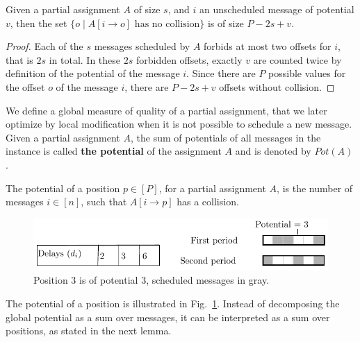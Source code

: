 \documentclass[a4paper,UKenglish,cleveref, autoref, thm-restate]{lipics-v2019}
\begin{document}
\begin{lemma}
Given a partial assignment $A$ of size $s$, and $i$ an unscheduled message of potential 
$v$, then the set $\{o \mid A[i \rightarrow o] \text{ has no collision}\}$ is of size $P - 2s + v$.
\end{lemma}
\begin{proof}
 Each of the $s$ messages scheduled by $A$ forbids at most two offsets for $i$, that is $2s$ in total. In these $2s$ forbidden offsets, exactly $v$ are counted twice by definition of the potential
 of the message $i$. Since there are $P$ possible values for the offset $o$ of the message $i$, there are $P - 2s + v$ offsets without collision.
\end{proof}

We define a global measure of quality of a partial assignment, that we later optimize by local modification when it is not possible to schedule a new message. 
Given a partial assignment $A$, the sum of potentials of all messages in the instance is called \textbf{the potential} of the assignment $A$ and is denoted by $Pot(A)$. 


\begin{definition}
The potential of a position $p \in [P]$, for a partial assignment $A$, is the number of messages $i \in [n]$, such that 
$A[i \rightarrow p]$ has a collision. 
\end{definition}

\begin{figure}
\begin{center}
\includegraphics[scale=1]{positionspotential}
\end{center}
\caption{Position $3$ is of potential $3$, scheduled messages in gray.}
\label{fig:positionpotential}
\end{figure}

The potential of a position is illustrated in Fig.~\ref{fig:positionpotential}.
Instead of decomposing the global potential as a sum over messages, it can be interpreted
as a sum over positions, as stated in the next lemma.
\end{document}
